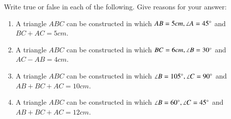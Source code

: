 Write true or false in each of the following. Give reasons for your answer:
\begin{enumerate}[label=\thesection.\arabic*,ref=\thesection.\theenumi,resume*]
\item A triangle $ABC$ can be constructed in which $AB = 5cm, \angle A =45\degree$ and $BC + AC = 5cm$.
\item A triangle $ABC$ can be constructed in which $BC = 6cm, \angle B =30\degree$ and $AC - AB=4cm$.
\item A triangle $ABC$ can be constructed in which $\angle B =105\degree,\angle C =90\degree$ and $AB + BC + AC = 10cm$.        
\item A triangle $ABC$ can be constructed in which $\angle B =60\degree, \angle C =45 \degree$ and $AB + BC + AC = 12cm$.           
\end{enumerate}
